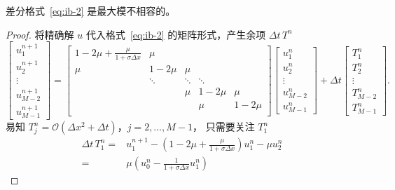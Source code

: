 \begin{example}
    差分格式~\eqref{eq:ib-2} 是最大模不相容的。
\end{example}

\begin{proof}
    将精确解 $u$ 代入格式~\eqref{eq:ib-2} 的矩阵形式，产生余项 $\Delta t\, T^n$
    \[
        \begin{bmatrix}
            u_1^{n+1} \\ u_2^{n+1} \\ \vdots \\ u_{M-2}^{n+1} \\ u_{M-1}^{n+1}
        \end{bmatrix}
        =
        \begin{bmatrix}
            1-2\mu + \frac{\mu}{1+\sigma \Delta x} & \mu    &        &        &        \\
            \mu                                    & 1-2\mu & \mu    &        &        \\
                                                   & \ddots & \ddots & \ddots &        \\
                                                   &        & \mu    & 1-2\mu & \mu    \\
                                                   &        &        & \mu    & 1-2\mu \\
        \end{bmatrix}
        \begin{bmatrix}
            u_1^{n} \\ u_2^{n} \\ \vdots \\ u_{M-2}^{n} \\ u_{M-1}^{n}
        \end{bmatrix}
        +
        \Delta t
        \begin{bmatrix}
            T_1^{n} \\ T_2^{n} \\ \vdots \\ T_{M-2}^{n} \\ T_{M-1}^{n}
        \end{bmatrix}.
    \]
    易知 $T_j^{n} = \mathcal{O}( \Delta x^2 + \Delta t)$，$j=2,\dots,M-1$，
    只需要关注 $T_1^{n}$
    \begin{align*}
        \Delta t\, T_1^{n} ={} & u_1^{n+1} - \left(1-2\mu + \frac{\mu}{1+\sigma \Delta x}\right) u_1^n - \mu u_2^n \\
        ={}                    & \mu \left(u_0^n - \frac{1}{1+\sigma \Delta x} u_1^n\right)

\end{align*}
\end{proof}
